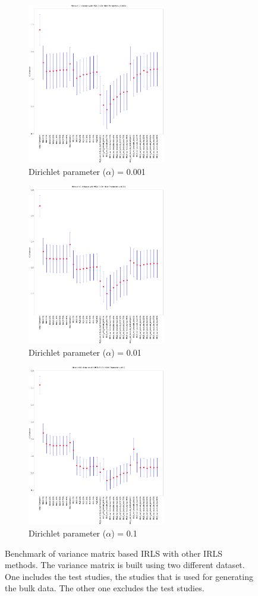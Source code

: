 \documentclass[10pt, a4paper, oneside]{article}
\begin{document}
\begin{figure}
    \centering
    \begin{subfigure}{6cm}
        \centering\includegraphics[width=6cm]{Figure3/0.001_L1}
        \caption{Dirichlet parameter ($\alpha$) = 0.001}
    \end{subfigure}
    \begin{subfigure}{6cm}
        \centering\includegraphics[width=6cm]{Figure3/0.01_L1}
        \caption{Dirichlet parameter ($\alpha$) = 0.01}
    \end{subfigure}

    \begin{subfigure}{6cm}
        \centering\includegraphics[width=6cm]{Figure3/0.1_L1}
        \caption{Dirichlet parameter ($\alpha$) = 0.1}
    \end{subfigure}
    \caption{Benchmark of variance matrix based IRLS with other IRLS methods. The variance matrix is built using two
    different dataset. One includes the test studies, the studies that is used for generating the bulk data. The other one
    excludes the test studies.}
    \label{fig3}
\end{figure}
\end{document}
